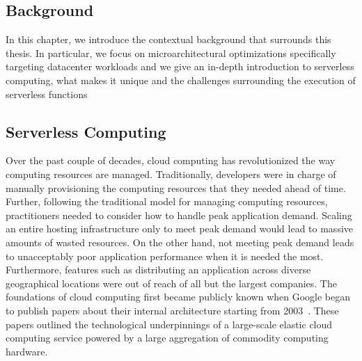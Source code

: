 \documentclass[../main.tex]{subfiles}
\begin{document}
\ifx\chapincluded\undefined
  \begin{refsection}
 \fi

\chapter{Background}
\label{chap:background}
In this chapter, we introduce the contextual background that surrounds
this thesis. In particular, we focus on microarchitectural
optimizations specifically targeting datacenter workloads and we give
an in-depth introduction to serverless computing, what makes it unique
and the challenges surrounding the execution of serverless functions



\section{Serverless Computing}
\label{sec:serverless}


Over the past couple of decades, cloud computing has revolutionized
the way computing resources are managed. Traditionally, developers
were in charge of manually provisioning the computing resources that
they needed ahead of time. Further, following the traditional model
for managing computing resources, practitioners needed to
consider how to handle peak application demand. Scaling an entire
hosting infrastructure only to meet peak demand would lead to massive
amounts of wasted resources. On the other hand, not meeting peak
demand leads to unacceptably poor application performance when it is
needed the most. Furthermore, features such as distributing an
application across diverse geographical locations were out of reach of
all but the largest companies. The foundations of cloud computing
first became publicly known when Google began to publish papers about
their internal architecture starting from
2003~\cite{qian2009cloud,gfs,dean2008mapreduce,barroso03_web_searc_planet}. These
papers outlined the technological underpinnings of a large-scale
elastic cloud computing service powered by a large aggregation of
commodity computing hardware.


\end{refsection}
\end{document}
